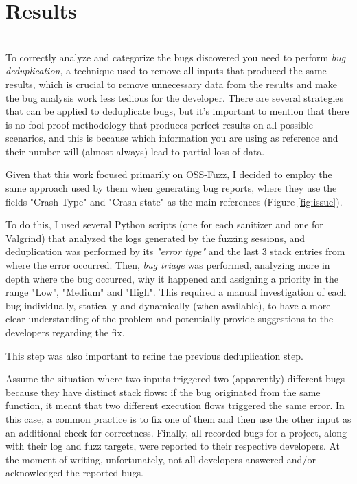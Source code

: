 \chapter{Results} \label{chap_4}
\ \\
To correctly analyze and categorize the bugs discovered you need to perform \textit{bug deduplication}, a technique used to remove all inputs that produced the same results, which is crucial to remove unnecessary data from the results and make the bug analysis work less tedious for the developer.
There are several strategies that can be applied to deduplicate bugs, but it's important to mention that there is no fool-proof methodology that produces perfect results on all possible scenarios, and this is because which information you are using as reference and their number will (almost always) lead to partial loss of data.

Given that this work focused primarily on OSS-Fuzz, I decided to employ the same approach used by them when generating bug reports, where they use the fields "Crash Type" and "Crash state" as the main references (Figure \ref{fig:issue}).

To do this, I used several Python scripts (one for each sanitizer and one for Valgrind) that analyzed the logs generated by the fuzzing sessions, and deduplication was performed by its \textit{"error type"} and the last 3 stack entries from where the error occurred.
Then, \textit{bug triage} was performed, analyzing more in depth where the bug occurred, why it happened and assigning a priority in the range "Low", "Medium" and "High". This required a manual investigation of each bug individually, statically and dynamically (when available), to have a more clear understanding of the problem and potentially provide suggestions to the developers regarding the fix.

This step was also important to refine the previous deduplication step.

Assume the situation where two inputs triggered two (apparently) different bugs because they have distinct stack flows: if the bug originated from the same function, it meant that two different execution flows triggered the same error. In this case, a common practice is to fix one of them and then use the other input as an additional check for correctness.
Finally, all recorded bugs for a project, along with their log and fuzz targets, were reported to their respective developers.
At the moment of writing, unfortunately, not all developers answered and/or acknowledged the reported bugs.




